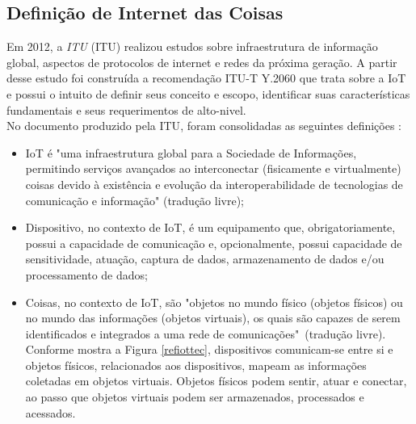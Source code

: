 \subsection{Definição de Internet das Coisas}
	\quad Em 2012, a \textit{\acrlong{ITU}} (\acrshort{ITU}) realizou estudos sobre infraestrutura
	de informação global, aspectos de protocolos de internet e redes da próxima geração.
	A partir desse estudo foi construída a recomendação ITU-T Y.2060 \cite{ITU} que trata sobre a \acrlong{IoT}
	e possui o intuito de definir seus conceito e escopo, identificar
	suas características fundamentais e seus requerimentos de alto-nivel.
  \\ \null
  \quad	No documento produzido pela \acrshort{ITU}, foram consolidadas as seguintes definições \cite{ITU}:
	\begin{itemize}
		\item \acrlong{IoT} é "uma infraestrutura global para a Sociedade de Informações, permitindo serviços avançados ao
		interconectar (fisicamente e virtualmente) coisas devido à existência e evolução da interoperabilidade
	de tecnologias de comunicação e informação" (tradução livre);%
		\item Dispositivo, no contexto de \acrshort{IoT}, é um equipamento que, obrigatoriamente, possui a capacidade
		de comunicação e, opcionalmente, possui capacidade de sensitividade, atuação, captura de dados,
		armazenamento de dados e/ou processamento de dados;
		\item Coisas, no contexto de \acrshort{IoT}, são "objetos
	no mundo físico (objetos físicos) ou no mundo das informações (objetos virtuais), os quais são capazes
	de serem identificados e integrados a uma rede de comunicações"\ (tradução livre). Conforme mostra a Figura \ref{refiottec}, dispositivos comunicam-se entre si e objetos físicos, relacionados aos dispositivos, mapeam as informações coletadas em objetos virtuais. Objetos físicos podem sentir, atuar e conectar, ao passo que objetos virtuais podem ser armazenados, processados e acessados.
	\end{itemize}

